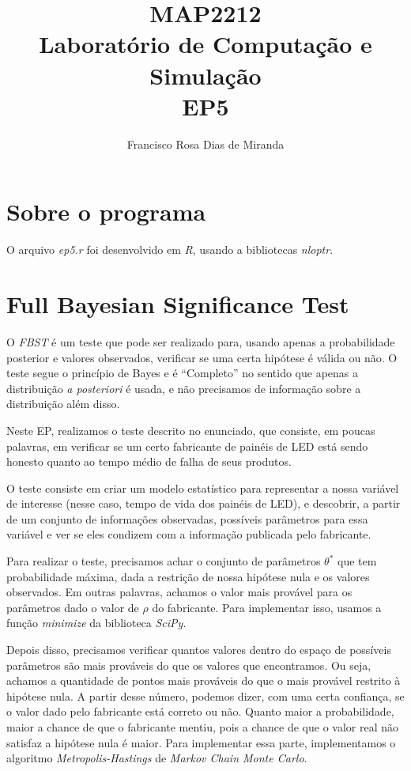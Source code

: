 \documentclass[a4paper]{article}
\begin{document}
\title{MAP2212 \\ Laboratório de Computação e Simulação \\ EP5}
\author{Francisco Rosa Dias de Miranda}

\maketitle

\section{Sobre o programa}

O arquivo \textit{ep5.r} foi desenvolvido em \emph{R}, usando a
bibliotecas \emph{nloptr}.

\section{Full Bayesian Significance Test}

O \textit{FBST} é um teste que pode ser realizado para, usando apenas a
probabilidade posterior e valores observados, verificar se uma certa hipótese é
válida ou não. O teste segue o princípio de Bayes e é ``Completo'' no sentido
que apenas a distribuição \textit{a posteriori} é usada, e não precisamos de
informação sobre a distribuição além disso.

Neste EP, realizamos o teste descrito no enunciado, que consiste, em poucas
palavras, em verificar se um certo fabricante de painéis de LED está sendo
honesto quanto ao tempo médio de falha de seus produtos.

O teste consiste em criar um modelo estatístico para representar a nossa
variável de interesse (nesse caso, tempo de vida dos painéis de LED), e
descobrir, a partir de um conjunto de informações observadas, possíveis
par\^ametros para essa variável e ver se eles condizem com a informação
publicada pelo fabricante.

Para realizar o teste, precisamos achar o conjunto de par\^ametros \(\theta^*\)
que tem probabilidade máxima, dada a restrição de nossa hipótese nula e os
valores observados. Em outras palavras, achamos o valor mais provável para os
par\^ametros dado o valor de \(\rho\) do fabricante. Para implementar isso,
usamos a função \textit{minimize} da biblioteca \emph{SciPy}.

Depois disso, precisamos verificar quantos valores dentro do espaço de
possíveis par\^ametros são mais prováveis do que os valores que encontramos. Ou
seja, achamos a quantidade de pontos mais prováveis do que o mais provável
restrito à hipótese nula. A partir desse número, podemos dizer, com uma certa
confiança, se o valor dado pelo fabricante está correto ou não. Quanto maior a
probabilidade, maior a chance de que o fabricante mentiu, pois a chance de que
o valor real não satisfaz a hipótese nula é maior. Para implementar essa parte,
implementamos o algoritmo \textit{Metropolis-Hastings} de \textit{Markov Chain
Monte Carlo}.
\end{document}
